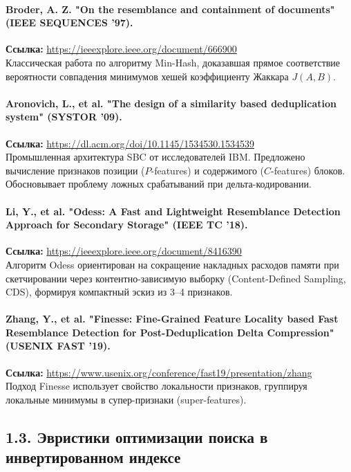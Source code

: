 \documentclass[a4paper,14pt]{extarticle}
\begin{document}
\paragraph{Broder, A. Z. "On the resemblance and containment of documents" (IEEE SEQUENCES '97).}
\textbf{Ссылка:} \url{https://ieeexplore.ieee.org/document/666900} \\
Классическая работа по алгоритму Min-Hash, доказавшая прямое соответствие вероятности совпадения минимумов хешей коэффициенту Жаккара $J(A, B)$.

\paragraph{Aronovich, L., et al. "The design of a similarity based deduplication system" (SYSTOR '09).}
\textbf{Ссылка:} \url{https://dl.acm.org/doi/10.1145/1534530.1534539} \\
Промышленная архитектура SBC от исследователей IBM. Предложено вычисление признаков позиции ($P$-features) и содержимого ($C$-features) блоков. Обосновывает проблему ложных срабатываний при дельта-кодировании.

\paragraph{Li, Y., et al. "Odess: A Fast and Lightweight Resemblance Detection Approach for Secondary Storage" (IEEE TC '18).}
\textbf{Ссылка:} \url{https://ieeexplore.ieee.org/document/8416390} \\
Алгоритм Odess ориентирован на сокращение накладных расходов памяти при скетчировании через контентно-зависимую выборку (Content-Defined Sampling, CDS), формируя компактный эскиз из 3--4 признаков.

\paragraph{Zhang, Y., et al. "Finesse: Fine-Grained Feature Locality based Fast Resemblance Detection for Post-Deduplication Delta Compression" (USENIX FAST '19).}
\textbf{Ссылка:} \url{https://www.usenix.org/conference/fast19/presentation/zhang} \\
Подход Finesse использует свойство локальности признаков, группируя локальные минимумы в супер-признаки (super-features).

\subsection*{1.3. Эвристики оптимизации поиска в инвертированном индексе}
\end{document}
